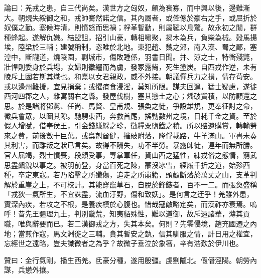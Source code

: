 \begin{pinyinscope}
論曰：羌戎之患，自三代尚矣。漢世方之匈奴，頗為衰寡，而中興以後，邊難漸大。朝規失綏御之和，戎帥騫然諾之信。其內屬者，或倥傯於豪右之手，或屈折於奴僕之勤。塞候時清，則憤怒而思禍；桴革暫動，則屬鞬以鳥驚。故永初之閒，群種蜂起。遂解仇嫌。結盟詛，招引山豪，轉相嘯聚，揭木為兵，負柴為械。穀馬揚埃，陸梁於三輔；建號稱制，恣睢於北地。東犯趙、魏之郊，南入漢、蜀之鄙，塞湟中，斷隴道，燒陵園，剽城市，傷敗踵係，羽書日聞。并、涼之士，特衝殘斃，壯悍則委身於兵場，女婦則徽纆而為虜，發冢露胔，死生塗炭。自西戎作逆，未有陵斥上國若斯其熾也。和熹以女君親政，威不外接。朝議憚兵力之損，情存苟安。或以邊州難援，宜見捐棄；或懼疽食浸淫，莫知所限。謀夫回遑，猛士疑慮，遂徙西河四郡之人，雜寓關右之縣。發屋伐樹，塞其戀土之心；燔破貲積，以防顧還之思。於是諸將鄧騭、任尚、馬賢、皇甫規、張奐之徒，爭設雄規，更奉征討之命，徵兵會眾，以圖其隙。馳騁東西，奔救首尾，搖動數州之境，日耗千金之資。至於假人增賦，借奉侯王，引金錢縑綵之珍，徵糧粟鹽鐵之積。所以賂遺購賞，轉輸勞來之費，前後數十巨萬。或梟剋酋健，摧破附落，降俘載路，牛羊滿山。軍書未奏其利害，而離叛之狀已言矣。故得不酬失，功不半勞。暴露師徒，連年而無所勝。官人屈竭，烈士憤喪，段熲受事，專掌軍任，資山西之猛性，練戎俗之態情，窮武思盡飆銳以事之。被羽前登，身當百死之陳，蒙沒冰雪，經履千折之道，始殄西種，卒定東寇。若乃陷擊之所殲傷，追走之所崩籍，頭顱斷落於萬丈之山，支革判解於重崖之上，不可校計。其能穿竄草石，自脫於鋒鏃者，百不一二。而張奐盛稱「戎狄一氣所生，不宜誅盡，流血汙野，傷和致妖」。是何言之迂乎！羌雖外患，實深內疾，若攻之不根，是養疾槙於心腹也。惜哉寇敵略定矣，而漢祚亦衰焉。嗚呼！昔先王疆理九土，判別畿荒，知夷貊殊性，難以道御，故斥遠諸華，薄其貢職，唯與辭要而已。若二漢御戎之方，失其本矣。何則？先零侵境，趙充國遷之內地；當煎作寇，馬文淵徙之三輔。貪其暫安之埶，信其馴服之情，計日用之權宜，忘經世之遠略，豈夫識微者之為乎？故微子垂泣於象箸，辛有浩歎於伊川也。

贊曰：金行氣剛，播生西羌。氐豪分種，遂用殷彊。虔劉隴北。假僭涇陽。朝勞內謀，兵憊外攘。


\end{pinyinscope}